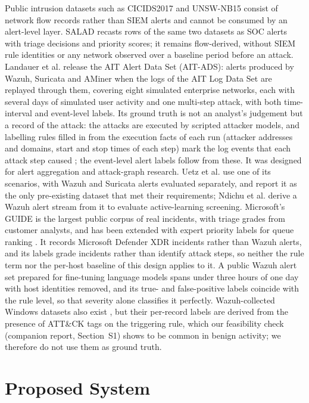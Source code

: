\documentclass[conference]{IEEEtran}
\begin{document}
Public intrusion datasets such as CICIDS2017 and UNSW-NB15 consist of network flow records rather than SIEM alerts and cannot be consumed by an alert-level layer. SALAD \cite{ref30} recasts rows of the same two datasets as SOC alerts with triage decisions and priority scores; it remains flow-derived, without SIEM rule identities or any network observed over a baseline period before an attack. Landauer et al. \cite{ref21} release the AIT Alert Data Set (AIT-ADS): alerts produced by Wazuh, Suricata and AMiner when the logs of the AIT Log Data Set \cite{ref22} are replayed through them, covering eight simulated enterprise networks, each with several days of simulated user activity and one multi-step attack, with both time-interval and event-level labels. Its ground truth is not an analyst's judgement but a record of the attack: the attacks are executed by scripted attacker models, and labelling rules filled in from the execution facts of each run (attacker addresses and domains, start and stop times of each step) mark the log events that each attack step caused \cite{ref22}; the event-level alert labels follow from these. It was designed for alert aggregation and attack-graph research. Uetz et al. \cite{ref26} use one of its scenarios, with Wazuh and Suricata alerts evaluated separately, and report it as the only pre-existing dataset that met their requirements; Ndichu et al. \cite{ref27} derive a Wazuh alert stream from it to evaluate active-learning screening. Microsoft's GUIDE \cite{ref28} is the largest public corpus of real incidents, with triage grades from customer analysts, and has been extended with expert priority labels for queue ranking \cite{ref29}. It records Microsoft Defender XDR incidents rather than Wazuh alerts, and its labels grade incidents rather than identify attack steps, so neither the rule term nor the per-host baseline of this design applies to it. A public Wazuh alert set prepared for fine-tuning language models \cite{ref31} spans under three hours of one day with host identities removed, and its true- and false-positive labels coincide with the rule level, so that severity alone classifies it perfectly. Wazuh-collected Windows datasets also exist \cite{ref23}, but their per-record labels are derived from the presence of ATT\&CK tags on the triggering rule, which our feasibility check (companion report, Section~S1) shows to be common in benign activity; we therefore do not use them as ground truth.

\section{Proposed System}
\label{sec:system}
\end{document}
